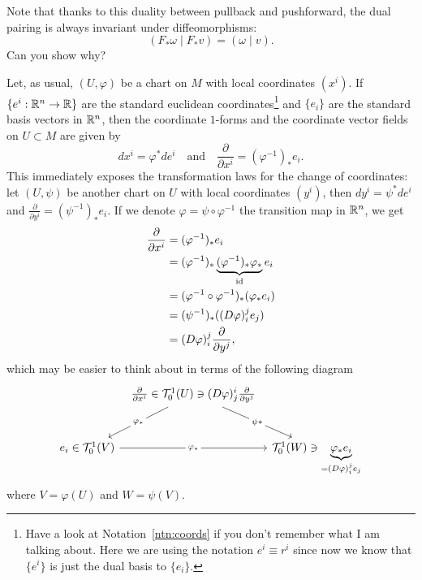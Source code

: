 Note that thanks to this duality between pullback and pushforward, the dual pairing is always invariant under diffeomorphisms:
\begin{equation}
  (F_* \omega \mid F_* v) = (\omega \mid v).
\end{equation}
Can you show why?

\begin{example}
  Let, as usual, $(U,\varphi)$ be a chart on $M$ with local coordinates $(x^i)$.
  If $\{e^i:\mathbb{R}^n\to\mathbb{R}\}$ are the standard euclidean coordinates\footnote{Have a look at Notation~\ref{ntn:coords} if you don't remember what I am talking about.
  Here we are using the notation $e^i \equiv r^i$ since now we know that $\{e^i\}$ is just the dual basis to $\{e_i\}$. } and $\{e_i\}$ are the standard basis vectors in $\mathbb{R}^n$, then the coordinate $1$-forms and the coordinate vector fields on $U\subset M$ are given by
  \begin{equation}
    dx^i = \varphi^* de^i
    \quad\mbox{and}\quad
    \frac{\partial}{\partial x^i} = (\varphi^{-1})_* e_i.
  \end{equation}
  This immediately exposes the transformation laws for the change of coordinates: let $(U, \psi)$ be another chart on $U$ with local coordinates $(y^i)$, then $dy^i = \psi^* de^i$ and $\frac{\partial}{\partial y^i} = (\psi^{-1})_* e_i$. If we denote $\varphi = \psi\circ\varphi^{-1}$ the transition map in $\mathbb{R}^n$, we get
  \begin{align}
    \frac{\partial}{\partial x^i} &= (\varphi^{-1})_* e_i \\
    &= (\varphi^{-1})_* \LaTeXunderbrace{(\varphi^{-1})_*\varphi_*}_{\id} e_i \\
    &= (\varphi^{-1}\circ \varphi^{-1})_* (\varphi_* e_i) \\
    &= (\psi^{-1})_* ((D\varphi)_i^j e_j) \\
    &= (D\varphi)_i^j \frac{\partial}{\partial y^j},
  \end{align}
  which may be easier to think about in terms of the following diagram
  \begin{equation}\nonumber
    \begin{tikzcd}[row sep=large, column sep=tiny]
      & \frac{\partial}{\partial x^i} \in \cT_0^1(U) \ni (D\varphi)_j^i \frac{\partial}{\partial y^j} \arrow[dl, "\varphi_*" description] \arrow[dr, "\psi*" description] & \\
      e_i \in \cT_0^1(V) \arrow[rr, "\varphi_*" description] & & \cT_0^1(W) \ni \LaTeXunderbrace{\varphi_* e_i}_{= (D\varphi)_i^j e_j}
    \end{tikzcd}
  \end{equation}
  where $V = \varphi(U)$ and $W = \psi(V)$.


\end{example}
